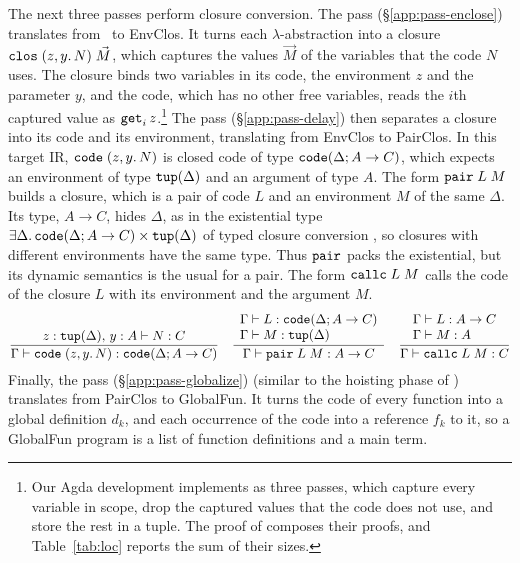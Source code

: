 The next three passes perform closure conversion. The 
pass (\S\ref{app:pass-enclose}) translates from \fpc\ to EnvClos.  It
turns each $\lambda$-abstraction into a closure $\mathtt{clos}\;(z,
y.\,N)\;\vec{M}$, which captures the values $\vec{M}$ of the variables
that the code $N$ uses. The closure binds two variables in its code,
the environment $z$ and the parameter $y$, and the code, which has no
other free variables, reads the $i$th captured value as
$\mathtt{get}_i\,z$.\footnote{Our Agda development implements
 as three passes, which capture every variable in scope,
drop the captured values that the code does not use, and store the
rest in a tuple. The proof of  composes their proofs,
and Table~\ref{tab:loc} reports the sum of their sizes.} The
 pass (\S\ref{app:pass-delay}) then separates a
closure into its code and its environment, translating from EnvClos to
PairClos. In this target IR, $\mathtt{code}\;(z, y.\,N)$ is closed code of
type $\mathtt{code}(\Delta; A \rightarrow C)$, which expects an
environment of type $\mathtt{tup}(\Delta)$ and an argument of type
$A$. The form $\mathtt{pair}\;L\;M$ builds a closure, which is a pair of
code $L$ and an environment $M$ of the same $\Delta$. Its type, $A
\rightarrow C$, hides $\Delta$, as in the existential type $\exists
\Delta.\, \mathtt{code}(\Delta; A \rightarrow C) \times \mathtt{tup}(\Delta)$
of typed closure conversion \citep{Minamide:1996ys}, so closures with
different environments have the same type. Thus $\mathtt{pair}$ packs
the existential, but its dynamic semantics is the usual for a pair. The
form $\mathtt{callc}\;L\;M$ calls the code of the closure $L$ with its
environment and the argument $M$.
\vspace{-5pt}
\begin{gather*}
  \frac{z : \mathtt{tup}(\Delta),\, y : A \vdash N : C}
       {\Gamma \vdash \mathtt{code}\;(z, y.\,N) : \mathtt{code}(\Delta; A \rightarrow C)}
  \quad
  \frac{\begin{array}{l}
        \Gamma \vdash L : \mathtt{code}(\Delta; A \rightarrow C)\\
        \Gamma \vdash M : \mathtt{tup}(\Delta)
        \end{array}}
       {\Gamma \vdash \mathtt{pair}\;L\;M : A \rightarrow C}
  \quad
  \frac{\begin{array}{l}
        \Gamma \vdash L : A \rightarrow C \\
        \Gamma \vdash M : A
        \end{array}}
       {\Gamma \vdash \mathtt{callc}\;L\;M : C}
\end{gather*}
Finally, the  pass (\S\ref{app:pass-globalize}) (similar
to the hoisting phase of \citet{Morrisett:1999fk}) translates from
PairClos to GlobalFun. It turns the code of every function into a
global definition $d_k$, and each occurrence of the code into a
reference $f_k$ to it, so a GlobalFun program is a list of function
definitions and a main term.

